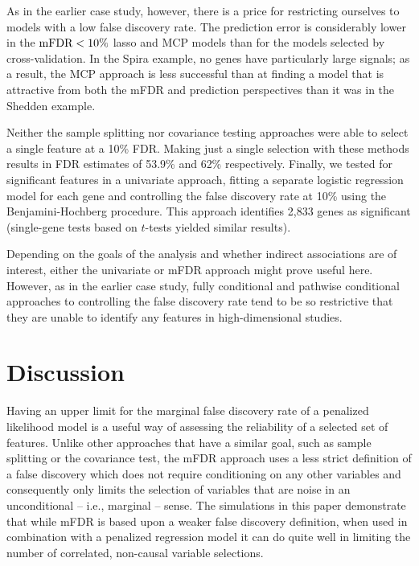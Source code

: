 As in the earlier case study, however, there is a price for restricting ourselves to models with a low false discovery rate.  The prediction error is considerably lower in the $\textrm{mFDR} < 10\%$ lasso and MCP models than for the models selected by cross-validation.  In the Spira example, no genes have particularly large signals; as a result, the MCP approach is less successful than at finding a model that is attractive from both the mFDR and prediction perspectives than it was in the Shedden example.

Neither the sample splitting nor covariance testing approaches were able to select a single feature at a 10\% FDR. Making just a single selection with these methods results in FDR estimates of 53.9\% and 62\% respectively.
Finally, we tested for significant features in a univariate approach, fitting a separate logistic regression model for each gene and controlling the false discovery rate at 10\% using the Benjamini-Hochberg procedure.
This approach identifies 2,833 genes as significant (single-gene tests based on $t$-tests yielded similar results).

Depending on the goals of the analysis and whether indirect associations are of interest, either the univariate or mFDR approach might prove useful here.
However, as in the earlier case study, fully conditional and pathwise conditional approaches to controlling the false discovery rate tend to be so restrictive that they are unable to identify any features in high-dimensional studies.

\section{Discussion}

Having an upper limit for the marginal false discovery rate of a penalized likelihood model is a useful way of assessing the reliability of a selected set of features. Unlike other approaches that have a similar goal, such as sample splitting or the covariance test, the mFDR approach uses a less strict definition of a false discovery which does not require conditioning on any other variables and consequently only limits the selection of variables that are noise in an unconditional -- i.e., marginal -- sense.  The simulations in this paper demonstrate that while mFDR is based upon a weaker false discovery definition, when used in combination with a penalized regression model it can do quite well in limiting the number of correlated, non-causal variable selections.

